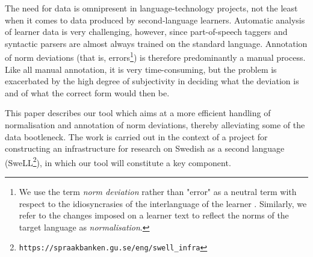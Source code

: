 \documentclass[10pt, a4paper]{article}
\newcommand{\normAnn}[0]{our tool }
\begin{document}
The need for data is omnipresent in language-technology projects, not the least when it comes to data produced by second-language learners.
Automatic analysis of learner data is very challenging, however, since part-of-speech taggers and syntactic parsers are almost always trained on the standard language. Annotation of norm deviations (that is, errors\footnote{We use the term {\em norm deviation} rather than "error" as a neutral term with respect to the idiosyncrasies of the interlanguage of the learner \cite{Selinker1972}. Similarly, we refer to the changes imposed on a learner text to reflect the norms of the target language as {\em normalisation}. }) is therefore predominantly a manual process. Like all manual annotation, it is very time-consuming, but the problem is exacerbated by the high degree of subjectivity in deciding what the deviation is and of what the correct form would then be.

This paper describes %
\normAnn which aims at a more efficient handling of normalisation and annotation of norm deviations, thereby alleviating some of the data bootleneck. The work is carried out in the context of a project for constructing an infrastructure for research on Swedish as a second language (SweLL\footnote{%
{\tt https://spraakbanken.gu.se/eng/swell\_infra}}), in which \normAnn will constitute a key component.


\end{document}
